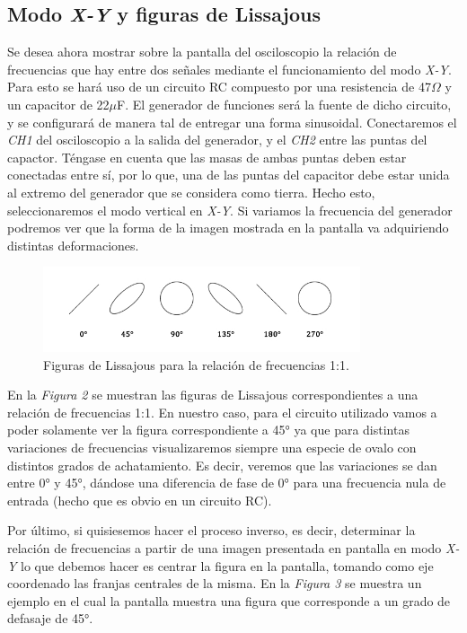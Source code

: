 \documentclass{article}
\begin{document}
\subsection{Modo \textit{X-Y} y figuras de Lissajous}
	
	Se desea ahora mostrar sobre la pantalla del osciloscopio la relación de frecuencias que hay entre dos señales mediante el funcionamiento del modo \textit{X-Y}. Para esto se hará uso de un circuito RC compuesto por una resistencia de 47$\Omega$ y un capacitor de 22$\mu$F. El generador de funciones será la fuente de dicho circuito, y se configurará de manera tal de entregar una forma sinusoidal. Conectaremos el \textit{CH1} del osciloscopio a la salida del generador, y el \textit{CH2} entre las puntas del capactor. Téngase en cuenta que las masas de ambas puntas deben estar conectadas entre sí, por lo que, una de las puntas del capacitor debe estar unida al extremo del generador que se considera como tierra. Hecho esto, seleccionaremos el modo vertical en \textit{X-Y}. Si variamos la frecuencia del generador podremos ver que la forma de la imagen mostrada en la pantalla va adquiriendo distintas deformaciones. 
\bigskip\bigskip\bigskip	


\begin{figure}[h]
	\centering
	\includegraphics[width=0.832\textwidth]{images/02-lissajouse-1a1.jpg}
	\medskip
	\caption{Figuras de Lissajous para la relación de frecuencias 1:1.}
\end{figure}
\bigskip\bigskip\bigskip


En la \textit{Figura 2} se muestran las figuras de Lissajous correspondientes a una relación de frecuencias 1:1. En nuestro caso, para el circuito utilizado vamos a poder solamente ver la figura correspondiente a 45° ya que para distintas variaciones de frecuencias visualizaremos siempre una especie de ovalo con distintos grados de achatamiento. Es decir, veremos que las variaciones se dan entre 0° y 45°, dándose una diferencia de fase de 0° para una frecuencia nula de entrada (hecho que es obvio en un circuito RC).
	\par
	Por último, si quisiesemos hacer el proceso inverso, es decir, determinar la relación de frecuencias a partir de una imagen presentada en pantalla en modo \textit{X-Y} lo que debemos hacer es centrar la figura en la pantalla, tomando como eje coordenado las franjas centrales de la misma. En la \textit{Figura 3} se muestra un ejemplo en el cual la pantalla muestra una figura que corresponde a un grado de defasaje de 45°.
\bigskip\bigskip
\end{document}
